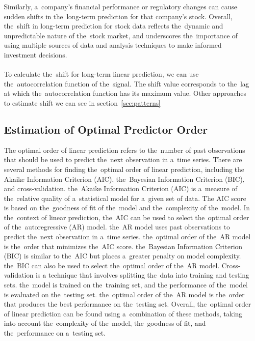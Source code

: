 Similarly, a~company's financial performance or regulatory changes can cause sudden shifts in the~long-term prediction
for that company's stock. Overall, the~shift in long-term prediction for stock data reflects the~dynamic and
unpredictable nature of the~stock market, and underscores the~importance of using multiple sources of data and analysis
techniques to make informed investment decisions.\\
\\
To calculate the~shift for long-term linear prediction, we can use the~autocorrelation function of the~signal.
The shift value corresponds to the~lag at which the~autocorrelation function has its maximum value. Other approaches to estimate shift we can see in section~\ref{sec:patterns}


\subsection{Estimation of Optimal Predictor Order} \label{subsec:orderlp}
The optimal order of linear prediction refers to the~number of past observations that should be used to predict the~next
observation in a~time series. There are several methods for finding the~optimal order of linear prediction, including
the Akaike Information Criterion (AIC), the~Bayesian Information Criterion (BIC), and cross-validation. the~Akaike
Information Criterion (AIC) is a~measure of the~relative quality of a~statistical model for a~given set of data.
The AIC score is based on the~goodness of fit of the~model and the~complexity of the~model. In the~context of linear
prediction, the~AIC can be used to select the~optimal order of the~autoregressive (AR) model. the~AR model uses past
observations to predict the~next observation in a~time series. the~optimal order of the~AR model is the~order that
minimizes the~AIC score. the~Bayesian Information Criterion (BIC) is similar to the~AIC but places a~greater penalty
on model complexity. the~BIC can also be used to select the~optimal order of the~AR model. Cross-validation is a
technique that involves splitting the~data into training and testing sets. the~model is trained on the~training set, and
the performance of the~model is evaluated on the~testing set. the~optimal order of the~AR model is the~order that produces
the best performance on the~testing set. Overall, the~optimal order of linear prediction can be found using a~combination
of these methods, taking into account the~complexity of the~model, the~goodness of fit, and the~performance on a~testing set.\\

